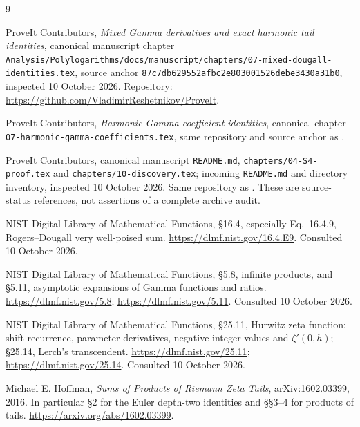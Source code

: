 \documentclass[11pt]{article}
\numberwithin{equation}{section}
\theoremstyle{definition}\newtheorem{definition}[theorem]{Definition}
\theoremstyle{remark}\newtheorem{remark}[theorem]{Remark}
\newcommand{\src}[1]{\nolinkurl{#1}}
\begin{document}
\clearpage
\begin{thebibliography}{9}
\raggedright
{}
ProveIt Contributors,
\emph{Mixed Gamma derivatives and exact harmonic tail identities},
canonical manuscript chapter
\src{Analysis/Polylogarithms/docs/manuscript/chapters/07-mixed-dougall-identities.tex},
source anchor \src{87c7db629552afbc2e803001526debe3430a31b0}, inspected 10 October 2026.
Repository: \url{https://github.com/VladimirReshetnikov/ProveIt}.

ProveIt Contributors,
\emph{Harmonic Gamma coefficient identities},
canonical chapter \src{07-harmonic-gamma-coefficients.tex}, same repository
and source anchor as \cite{ct:repo-mixed}.

ProveIt Contributors,
canonical manuscript \src{README.md}, \src{chapters/04-S4-proof.tex}
and \src{chapters/10-discovery.tex}; incoming \src{README.md} and directory
inventory, inspected 10 October 2026. Same repository as \cite{ct:repo-mixed}.
These are source-status references, not assertions of a complete archive audit.

NIST Digital Library of Mathematical Functions,
\S16.4, especially Eq.~16.4.9, Rogers--Dougall very well-poised sum.
\url{https://dlmf.nist.gov/16.4.E9}. Consulted 10 October 2026.

NIST Digital Library of Mathematical Functions,
\S5.8, infinite products, and \S5.11, asymptotic expansions of Gamma
functions and ratios.
\url{https://dlmf.nist.gov/5.8}; \url{https://dlmf.nist.gov/5.11}.
Consulted 10 October 2026.

NIST Digital Library of Mathematical Functions,
\S25.11, Hurwitz zeta function: shift recurrence, parameter derivatives,
negative-integer values and $\zeta'(0,h)$; \S25.14, Lerch's transcendent.
\url{https://dlmf.nist.gov/25.11}; \url{https://dlmf.nist.gov/25.14}.
Consulted 10 October 2026.

Michael E. Hoffman,
\emph{Sums of Products of Riemann Zeta Tails},
arXiv:1602.03399, 2016. In particular \S2 for the Euler depth-two identities
and \S\S3--4 for products of tails.
\url{https://arxiv.org/abs/1602.03399}.
\end{thebibliography}
\end{document}
